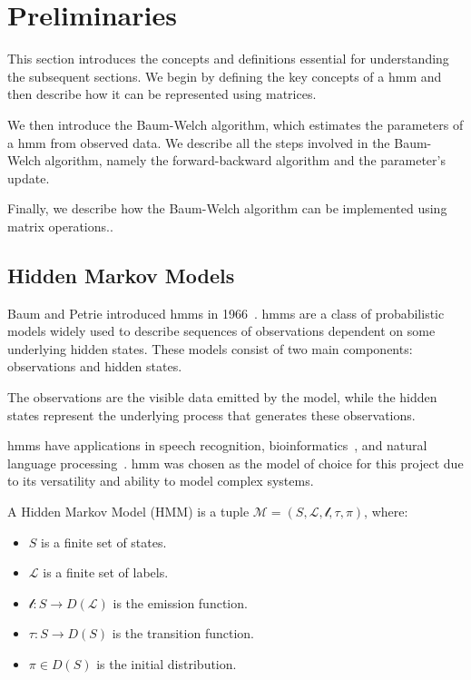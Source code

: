 \section{Preliminaries}\label{sec:preliminaries}
This section introduces the concepts and definitions essential for understanding the subsequent sections.
We begin by defining the key concepts of a \gls{hmm} and then describe how it can be represented using matrices.

We then introduce the Baum-Welch algorithm, which estimates the parameters of a \gls{hmm} from observed data.
We describe all the steps involved in the Baum-Welch algorithm, namely the forward-backward algorithm and the parameter's update.

Finally, we describe how the Baum-Welch algorithm can be implemented using matrix operations..

\subsection{Hidden Markov Models}\label{subsec:hmm}
Baum and Petrie introduced \glspl{hmm} in 1966~\cite{baum1966statistical}.
\glspl{hmm} are a class of probabilistic models widely used to describe sequences of observations dependent on some underlying hidden states.
These models consist of two main components: observations and hidden states.

The observations are the visible data emitted by the model, while the hidden states represent the underlying process that generates these observations.

\glspl{hmm} have applications in speech recognition\cite{chavan2013overview}, bioinformatics~\cite{de2007hidden}, and natural language processing~\cite{murveit1990integrating}.
\gls{hmm} was chosen as the model of choice for this project due to its versatility and ability to model complex systems.

\begin{definition}
    A Hidden Markov Model (HMM) is a tuple $\mathcal{M} = (S, \mathcal{L}, \mathscr{l}, \tau,  \pi)$, where:
    \begin{itemize}
        \item $S$ is a finite set of states.
        \item $\mathcal{L}$ is a finite set of labels.
        \item $\mathscr{l}: S \rightarrow D(\mathcal{L})$ is the emission function.
        \item $\tau: S \rightarrow D(S)$ is the transition function.
        \item $\pi \in D(S)$ is the initial distribution.
    \end{itemize}
\end{definition}

